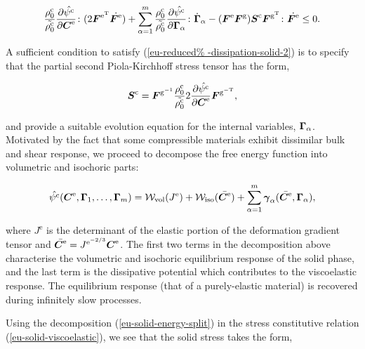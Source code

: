 \begin{equation}
\frac{\rho_{0}^{\mathrm{c}}}{\tilde{\rho_{0}^{\mathrm{c}}}}
\frac{\partial \hat{\psi^{\mathrm{c}}}}{\partial \mbox{\boldmath$ C$}^{\mathrm{e}}}
\colon (2 \mbox{\boldmath$ F$}^{\mathrm{e}^{\mathrm{T}}} \dot{\mbox{\boldmath$ F$}^{\mathrm{e}}}) +
\sum_{\alpha=1}^{m}
\frac{\rho_{0}^{\mathrm{c}}}{\tilde{\rho_{0}^{\mathrm{c}}}}
\frac{\partial \hat{\psi^{\mathrm{c}}}}{\partial \mbox{\boldmath$\Gamma$}_{\alpha}}
\colon \dot{\mbox{\boldmath$\Gamma$}}_{\alpha} - (\mbox{\boldmath$ F$}^{\mathrm{e}}\mbox{\boldmath$ F$}^{\mathrm{g}})
\mbox{\boldmath$ S$}^{\mathrm{c}} \mbox{\boldmath$ F$}^{\mathrm{g}^{\mathrm{T}}} \colon
\dot{\mbox{\boldmath$ F$}^{\mathrm{e}}} \leq 0.
\label{eu-reduced-dissipation-solid-2}
\end{equation}

\noindent A sufficient condition to satisfy (\ref{eu-reduced%
  -dissipation-solid-2}) is to specify that the partial second
Piola-Kirchhoff stress tensor has the form,

\begin{equation}
\mbox{\boldmath$ S$}^{\mathrm{c}} = \mbox{\boldmath$ F$}^{\mathrm{g}^{\mathrm{-1}}}
\frac{\rho_{0}^{\mathrm{c}}}{\tilde{\rho_{0}^{\mathrm{c}}}} 2
\frac{\partial \hat{\psi^{\mathrm{c}}}}{\partial \mbox{\boldmath$ C$}^{\mathrm{e}}}
\mbox{\boldmath$ F$}^{\mathrm{g}^{\mathrm{-T}}},
\label{eu-solid-viscoelastic}
\end{equation}

\noindent and provide a suitable evolution equation for the internal
variables, $\mbox{\boldmath$\Gamma$}_{\alpha}$. Motivated by the fact that some
compressible materials exhibit dissimilar bulk and shear response, we
proceed to decompose the free energy function into volumetric and
isochoric parts:

\begin{equation}
\hat{\psi^{\mathrm{c}}} (\mbox{\boldmath$ C$}^{\mathrm{e}}, \mbox{\boldmath$\Gamma$}_{1}, \ldots,
\mbox{\boldmath$\Gamma$}_{m}) = {\mathcal W}_{\mathrm{vol}}(J^{\mathrm{e}}) +
{\mathcal W}_{\mathrm{iso}}(\bar{\mbox{\boldmath$ C$}^{\mathrm{e}}}) +
\sum_{\alpha=1}^{m}\mbox{\boldmath$\gamma$}_{\alpha}
(\bar{\mbox{\boldmath$ C$}^{\mathrm{e}}},\mbox{\boldmath$\Gamma$}_{\alpha}),
\label{eu-solid-energy-split}
\end{equation}

\noindent where $J^{\mathrm{e}}$ is the determinant of the elastic
portion of the deformation gradient tensor and
$\bar{\mbox{\boldmath$ C$}^{\mathrm{e}}}=J^{\mathrm{e}^{-2/3}}\mbox{\boldmath$ C$}^{\mathrm{e}}$. The
first two terms in the decomposition above characterise the volumetric
and isochoric equilibrium response of the solid phase, and the last
term is the dissipative potential which contributes to the
viscoelastic response. The equilibrium response (that of a
purely-elastic material) is recovered during infinitely slow
processes.

Using the decomposition (\ref{eu-solid-energy-split}) in the stress
constitutive relation (\ref{eu-solid-viscoelastic}), we see that the
solid stress takes the form,


